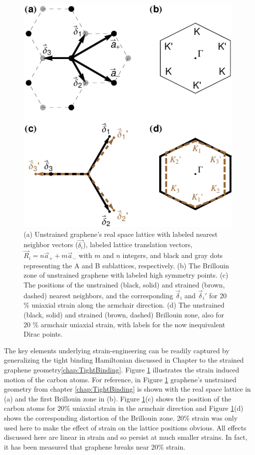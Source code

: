 \begin{figure}
\includegraphics{Figs_PVP/figure_1.pdf}
\caption{\label{fig:PVP:lattice} (a) Unstrained graphene's real space lattice with labeled nearest neighbor vectors ($\vec{\delta_i}$), labeled lattice translation vectors, $\vec{R}_i=n\vec{a}_+ + m \vec{a}_-$ with $m$ and $n$ integers, and black and gray dots representing the A and B sublattices, respectively. (b) The Brillouin zone of unstrained graphene with labeled high symmetry points. (c) The positions of the unstrained (black, solid) and strained (brown, dashed) nearest neighbors, and the corresponding $\vec{\delta}_i$ and $\vec{\delta}_i'$ for 20 \% uniaxial strain along the armchair direction.  (d) The unstrained (black, solid) and strained (brown, dashed) Brillouin zone, also for 20 \% armchair uniaxial strain, with labels for the now inequivalent Dirac points. }
\end{figure}

The key elements underlying strain-engineering can be readily captured by generalizing the tight binding Hamiltonian discussed in Chapter to the strained graphene geometry\ref{chap:TightBinding}.
Figure \ref{fig:PVP:lattice} illustrates the strain induced motion of the carbon atoms.
For reference, in Figure \ref{fig:PVP:lattice} graphene's unstrained geometry from chapter \ref{chap:TightBinding} is shown with the real space lattice in (a) and the first Brillouin zone in (b).
Figure \ref{fig:PVP:lattice}(c) shows the position of the carbon atoms for 20\% uniaxial strain in the armchair direction and Figure \ref{fig:PVP:lattice}(d) shows the corresponding distortion of the Brillouin zone.
20\% strain was only used here to make the effect of strain on the lattice positions obvious.
All effects discussed here are linear in strain and so persist at much smaller strains.
In fact, it has been measured that graphene breaks near 20\% strain\cite{Lee2008}.

